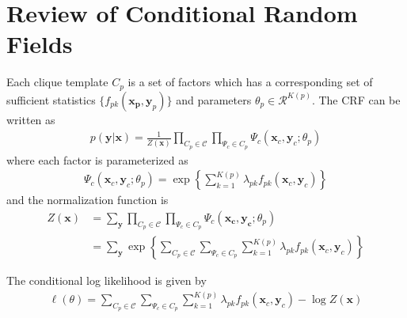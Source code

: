 \chapter{Review of Conditional Random Fields}\label{app:crf}
Each clique template $C_p$ is a set of factors which has a corresponding set
of sufficient statistics $\{f_{pk}(\mathbf{x_p}, \mathbf{y}_p)\}$ and
parameters $\theta_p\in\mathcal{R}^{K(p)}$. The CRF can be written as
\begin{align}
p(\mathbf{y}|\mathbf{x}) = \frac{1}{Z(\mathbf{x})}\prod_{C_p\in
\mathcal{C}}\prod_{\Psi_c\in C_p}\Psi_c(\mathbf{x}_c,
\mathbf{y}_c;\theta_p)
\end{align}
where each factor is parameterized as
\begin{align}
\Psi_c(\mathbf{x}_c, \mathbf{y}_c;\theta_p) =
\exp\left\{\sum_{k=1}^{K(p)}\lambda_{pk}f_{pk}(\mathbf{x}_c,
\mathbf{y}_c)\right\}
\end{align}
and the normalization function is
\begin{align}
Z(\mathbf{x})
&= \sum_{\mathbf{y}}\prod_{C_p\in\mathcal{C}}\prod_{\Psi_c\in
C_p}\Psi_c(\mathbf{x_c}, \mathbf{y_c}; \theta_p)\\
&= \sum_{\mathbf{y}}\exp\left\{\sum_{C_p\in\mathcal{C}}\sum_{\Psi_c\in
C_p}\sum_{k=1}^{K(p)}\lambda_{pk}f_{pk}(\mathbf{x}_c,
\mathbf{y}_c)\right\}
\end{align}

The conditional log likelihood is given by
\begin{align}
\ell(\theta) = \sum_{C_p\in\mathcal{C}}\sum_{\Psi_c\in
C_p}\sum_{k=1}^{K(p)}\lambda_{pk}f_{pk}(\mathbf{x}_c, \mathbf{y}_c) - \log Z(\mathbf{x})
\end{align}

